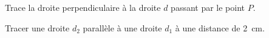 \documentclass[../../syllabus_1.tex]{subfiles}
\begin{document}
\begin{exercise}
    Trace la droite perpendiculaire à la droite $d$ passant par le point $P$.
    \vfil
    \begin{center}
    \end{center}
\end{exercise}

\newpage
\begin{tcolorbox}[title=Parallèle ($\varparallel$)]
    Tracer une droite $d_2$ parallèle à une droite $d_1$ à une distance de
    \qty{2}{cm}.


\end{tcolorbox}
\end{document}
